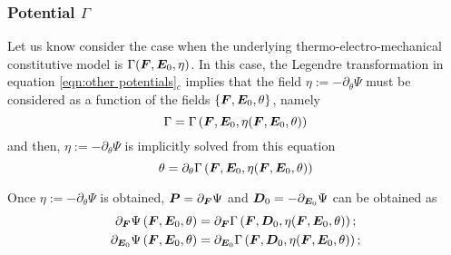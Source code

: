 \subsubsection{Potential $\Gamma$}

Let us know consider the case when the underlying thermo-electro-mechanical constitutive model is $\Gamma(\boldsymbol{F},\boldsymbol{E}_0,\eta)$. In this case, the Legendre transformation in equation \eqref{eqn:other potentials}$_c$ implies that the field
$\eta:=-\partial_{\theta}\Psi$ must be considered as a function of the fields $\{\boldsymbol{F},\boldsymbol{E}_0,\theta\}$, namely
%
\begin{equation}\label{eqn:change of variable for Gamma}
	\Gamma=\Gamma\left(\boldsymbol{F},\boldsymbol{E}_0,\eta(\boldsymbol{F},\boldsymbol{E}_0,\theta)\right)
\end{equation}
%
and then, $\eta:=-\partial_{\theta}\Psi$ is implicitly solved from this equation
%
\begin{equation}
	\theta=\partial_{\theta}\Gamma\left(\boldsymbol{F},\boldsymbol{E}_0,\eta(\boldsymbol{F},\boldsymbol{E}_0,\theta)\right)
\end{equation}

Once $\eta:=-\partial_{\theta}\Psi$ is obtained, $\boldsymbol{P}=\partial_{\boldsymbol{F}}\Psi$ and $\boldsymbol{D}_0=-\partial_{\boldsymbol{E}_0}\Psi$ can be obtained as
%
\begin{equation}
	\begin{aligned}
		\partial_{\boldsymbol{F}}\Psi\left(\boldsymbol{F},\boldsymbol{E}_0,\theta\right)&=\partial_{\boldsymbol{F}}\Gamma\left(\boldsymbol{F},\boldsymbol{D}_0,\eta(\boldsymbol{F},\boldsymbol{E}_0,\theta)\right);\\
		\partial_{\boldsymbol{E}_0}\Psi\left(\boldsymbol{F},\boldsymbol{E}_0,\theta\right)&=\partial_{\boldsymbol{E}_0}\Gamma\left(\boldsymbol{F},\boldsymbol{D}_0,\eta(\boldsymbol{F},\boldsymbol{E}_0,\theta)\right);
	\end{aligned}
\end{equation}

